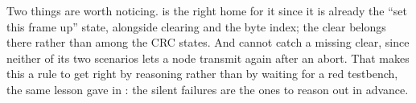 Two things are worth noticing.  is the right home for it since it is already the
``set this frame up'' state, alongside clearing  and the byte index; the clear belongs
there rather than among the CRC states. And  cannot catch a missing clear,
since neither of its two scenarios lets a node transmit again after an abort. That makes this a rule
to get right by reasoning rather than by waiting for a red testbench, the same lesson 
gave in : the silent failures are the ones to reason out in advance.
